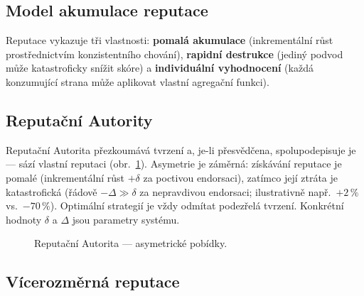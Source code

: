 \documentclass[11pt,a4paper,twocolumn]{article}
\begin{document}
\subsection{Model akumulace reputace}

Reputace vykazuje tři vlastnosti: \textbf{pomalá akumulace} (inkrementální růst prostřednictvím konzistentního chování), \textbf{rapidní destrukce} (jediný podvod může katastroficky snížit skóre) a \textbf{individuální vyhodnocení} (každá konzumující strana může aplikovat vlastní agregační funkci).

\subsection{Reputační Autority}

Reputační Autorita přezkoumává tvrzení a, je-li přesvědčena, spolupodepisuje je --- sází vlastní reputaci (obr.~\ref{fig:authority}). Asymetrie je záměrná: získávání reputace je pomalé (inkrementální růst $+\delta$ za poctivou endorsaci), zatímco její ztráta je katastrofická (řádově $-\Delta \gg \delta$ za nepravdivou endorsaci; ilustrativně např.\ $+2\,\%$ vs.\ $-70\,\%$). Optimální strategií je vždy odmítat podezřelá tvrzení. Konkrétní hodnoty $\delta$ a $\Delta$ jsou parametry systému.

\begin{figure}[ht]
\centering
{}
\caption{Reputační Autorita --- asymetrické pobídky.}
\label{fig:authority}
\end{figure}

\subsection{Vícerozměrná reputace}
\end{document}
